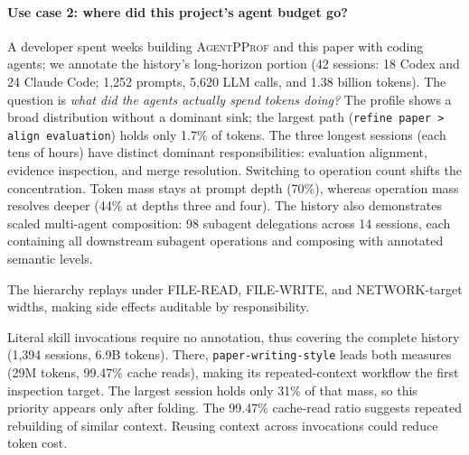 \documentclass[sigconf,nonacm]{acmart}
\newcommand{\sys}{\textsc{AgentPProf}\xspace}
\begin{document}
\paragraph{Use case 2: where did this project's agent budget go?}
A developer spent weeks building \sys{} and this paper with coding agents; we annotate the history's long-horizon portion (42 sessions: 18 Codex and 24 Claude Code; 1{,}252 prompts, 5{,}620 LLM calls, and 1.38 billion tokens).
The question is \emph{what did the agents actually spend tokens doing?}
The profile shows a broad distribution without a dominant sink; the largest path (\texttt{refine paper > align evaluation}) holds only 1.7\% of tokens.
The three longest sessions (each tens of hours) have distinct dominant responsibilities: evaluation alignment, evidence inspection, and merge resolution.
Switching to operation count shifts the concentration. Token mass stays at prompt depth (70\%), whereas operation mass resolves deeper (44\% at depths three and four).
The history also demonstrates scaled multi-agent composition: 98 subagent delegations across 14 sessions, each containing all downstream subagent operations and composing with annotated semantic levels.

The hierarchy replays under FILE-READ, FILE-WRITE, and NETWORK-target widths, making side effects auditable by responsibility.

Literal skill invocations require no annotation, thus covering the complete history (1{,}394 sessions, 6.9B tokens).
There, \texttt{paper-writing-style} leads both measures (29M tokens, 99.47\% cache reads), making its repeated-context workflow the first inspection target. The largest session holds only 31\% of that mass, so this priority appears only after folding.
The 99.47\% cache-read ratio suggests repeated rebuilding of similar context. Reusing context across invocations could reduce token cost.
\end{document}
